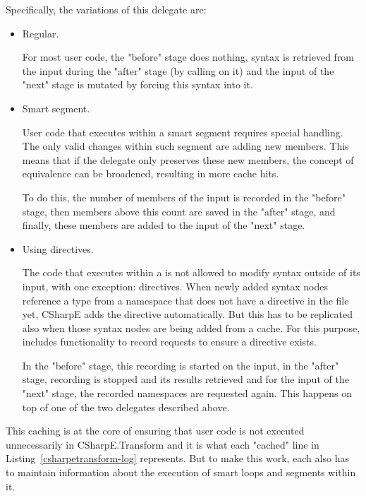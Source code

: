 Specifically, the variations of this delegate are:

\begin{itemize}
\item Regular.

For most user code, the "before" stage does nothing, syntax is retrieved from the input during the "after" stage (by calling  on it) and the input of the "next" stage is mutated by forcing this syntax into it.

\item Smart segment.

User code that executes within a smart segment requires special handling. The only valid changes within such segment are adding new members. This means that if the delegate only preserves these new members, the concept of equivalence can be broadened, resulting in more cache hits.

To do this, the number of members of the input is recorded in the "before" stage, then members above this count are saved in the "after" stage, and finally, these members are added to the input of the "next" stage.

\item Using directives.

The code that executes within a  is not allowed to modify syntax outside of its input, with one exception:  directives. When newly added syntax nodes reference a type from a name\-space that does not have a  directive in the file yet, CSharpE adds the directive automatically. But this has to be replicated also when those syntax nodes are being added from a cache. For this purpose,  includes functionality to record requests to ensure a  directive exists.

In the "before" stage, this recording is started on the input, in the "after" stage, recording is stopped and its results retrieved and for the input of the "next" stage, the recorded namespaces are requested again. This happens on top of one of the two delegates described above.
\end{itemize}

This caching is at the core of ensuring that user code is not executed unnecessarily in CSharpE.Transform and it is what each "cached" line in Listing~\ref{csharpetransform-log} represents. But to make this work, each  also has to maintain information about the execution of smart loops and segments within it.

